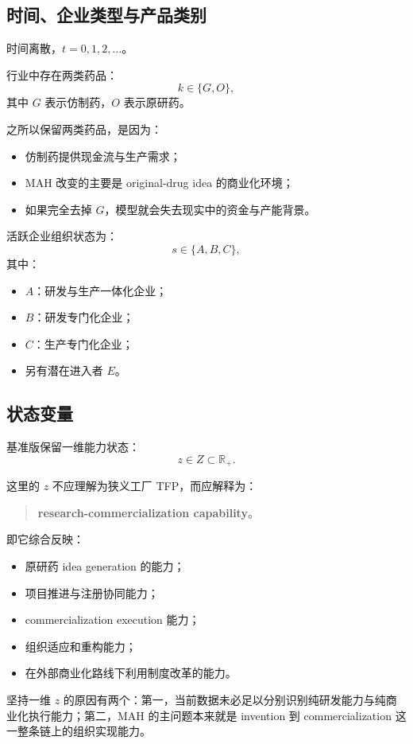 \documentclass[12pt,fontset=none]{ctexart}
\begin{document}
\subsection{时间、企业类型与产品类别}

时间离散，$t=0,1,2,\ldots$。

行业中存在两类药品：
\[
 k\in\{G,O\},
\]
其中 $G$ 表示仿制药，$O$ 表示原研药。

之所以保留两类药品，是因为：
\begin{itemize}
    \item 仿制药提供现金流与生产需求；
    \item MAH 改变的主要是 original-drug idea 的商业化环境；
    \item 如果完全去掉 $G$，模型就会失去现实中的资金与产能背景。
\end{itemize}

活跃企业组织状态为：
\[
 s\in\{A,B,C\},
\]
其中：
\begin{itemize}
    \item $A$：研发与生产一体化企业；
    \item $B$：研发专门化企业；
    \item $C$：生产专门化企业；
    \item 另有潜在进入者 $E$。
\end{itemize}

\subsection{状态变量}

基准版保留一维能力状态：
\[
 z\in Z\subset \mathbb R_+.
\]

这里的 $z$ 不应理解为狭义工厂 TFP，而应解释为：

\begin{quote}
\textbf{research-commercialization capability}。
\end{quote}

即它综合反映：
\begin{itemize}
    \item 原研药 idea generation 的能力；
    \item 项目推进与注册协同能力；
    \item commercialization execution 能力；
    \item 组织适应和重构能力；
    \item 在外部商业化路线下利用制度改革的能力。
\end{itemize}

坚持一维 $z$ 的原因有两个：第一，当前数据未必足以分别识别纯研发能力与纯商业化执行能力；第二，MAH 的主问题本来就是 invention 到 commercialization 这一整条链上的组织实现能力。
\end{document}
